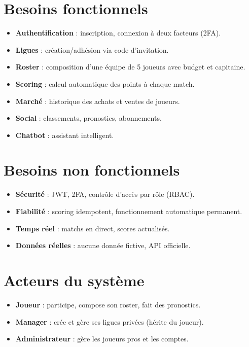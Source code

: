 \documentclass[12pt,a4paper]{report}
\begin{document}
\section{Besoins fonctionnels}
\begin{itemize}
  \item \textbf{Authentification} : inscription, connexion à deux facteurs (2FA).
  \item \textbf{Ligues} : création/adhésion via code d'invitation.
  \item \textbf{Roster} : composition d'une équipe de 5 joueurs avec budget et capitaine.
  \item \textbf{Scoring} : calcul automatique des points à chaque match.
  \item \textbf{Marché} : historique des achats et ventes de joueurs.
  \item \textbf{Social} : classements, pronostics, abonnements.
  \item \textbf{Chatbot} : assistant intelligent.
\end{itemize}

\section{Besoins non fonctionnels}
\begin{itemize}
  \item \textbf{Sécurité} : JWT, 2FA, contrôle d'accès par rôle (RBAC).
  \item \textbf{Fiabilité} : scoring idempotent, fonctionnement automatique permanent.
  \item \textbf{Temps réel} : matchs en direct, scores actualisés.
  \item \textbf{Données réelles} : aucune donnée fictive, API officielle.
\end{itemize}

\section{Acteurs du système}
\begin{itemize}
  \item \textbf{Joueur} : participe, compose son roster, fait des pronostics.
  \item \textbf{Manager} : crée et gère ses ligues privées (hérite du joueur).
  \item \textbf{Administrateur} : gère les joueurs pros et les comptes.
\end{itemize}
\end{document}
